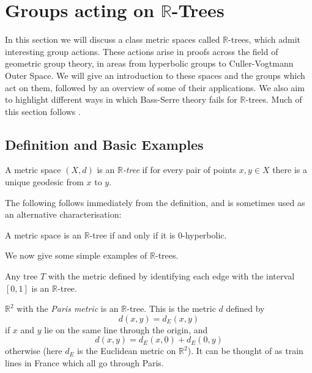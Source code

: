 \section{Groups acting on $\mathbb{R}$-Trees}
\label{sec:groups_acting_on_R_trees}

In this section we will discuss a class metric spaces called $\mathbb{R}$-trees, which admit interesting group actions. These actions arise in proofs across the field of geometric group theory, in areas from hyperbolic groups to Culler-Vogtmann Outer Space. We will give an introduction to these spaces and the groups which act on them, followed by an overview of some of their applications. We also aim to highlight different ways in which Bass-Serre theory fails for $\mathbb{R}$-trees. Much of this section follows \cite{Bestvina_trees}.
\subsection{Definition and Basic Examples}
\begin{definition}
    A metric space $(X,d)$ is an \emph{$\mathbb{R}$-tree} if for every pair of points $x,y\in X$ there is a unique geodesic from $x$ to $y$.
\end{definition}

The following follows immediately from the definition, and is sometimes used as an alternative characterisation:

\begin{proposition}
    A metric space is an $\mathbb{R}$-tree if and only if it is 0-hyperbolic.
\end{proposition}

We now give some simple examples of $\mathbb{R}$-trees.

\begin{example}
    Any tree $T$ with the metric defined by identifying each edge with the interval $[0,1]$ is an $\mathbb{R}$-tree.
\end{example}

\begin{example}\label{Paris}
    $\mathbb{R}^2$ with the \textit{Paris metric} is an $\mathbb{R}$-tree. This is the metric $d$ defined by\[d(x,y)=d_E(x,y)\]if $x$ and $y$ lie on the same line through the origin, and\[d(x,y)=d_E(x,0)+d_E(0,y)\] otherwise (here $d_E$ is the Euclidean metric on $\mathbb{R}^2$). It can be thought of as train lines in France which all go through Paris.
\end{example}

